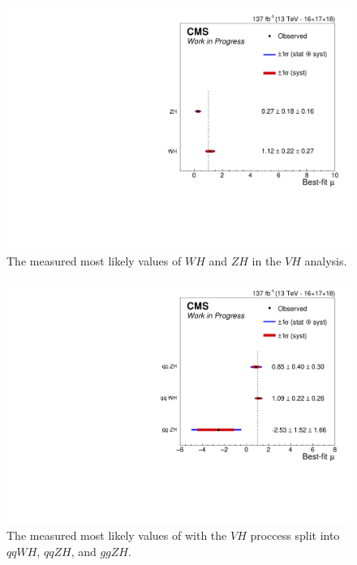\begin{figure}
  \centering
  \includegraphics[width=0.8\linewidth]{figures/210309_vh_unblinded_Xbb_8f854f5a_a866aef8/summary_stxs.pdf}
  \caption[Measured values of $W\!H$ and $Z\!H$]{
    The measured most likely values of $W\!H$ and $Z\!H$ in the
    $V\!H$ analysis.
  }
  \label{fig:vh-whzh}
\end{figure}

\begin{figure}
  \centering
  \includegraphics[width=0.8\linewidth]{figures/210413_perproc_unblinded_Xbb_c215af6f_48193845/summary_stxs.pdf}
  \caption[Measured values of $qqW\!H$, $qqZ\!H$, and $ggZ\!H$]{
    The measured most likely values of with the $V\!H$ proccess split into
    $qqW\!H$, $qqZ\!H$, and $ggZ\!H$.
  }
  \label{fig:vh-ggzh}
\end{figure}

